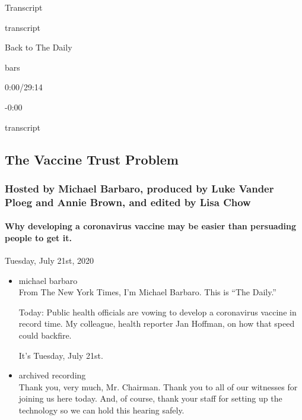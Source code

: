 Transcript

transcript

Back to The Daily

bars

0:00/29:14

-0:00

transcript

\hypertarget{the-vaccine-trust-problem-2}{%
\subsection{The Vaccine Trust
Problem}\label{the-vaccine-trust-problem-2}}

\hypertarget{hosted-by-michael-barbaro-produced-by-luke-vander-ploeg-and-annie-brown-and-edited-by-lisa-chow-1}{%
\subsubsection{Hosted by Michael Barbaro, produced by Luke Vander Ploeg
and Annie Brown, and edited by Lisa
Chow}\label{hosted-by-michael-barbaro-produced-by-luke-vander-ploeg-and-annie-brown-and-edited-by-lisa-chow-1}}

\hypertarget{why-developing-a-coronavirus-vaccine-may-be-easier-than-persuading-people-to-get-it-2}{%
\paragraph{Why developing a coronavirus vaccine may be easier than
persuading people to get
it.}\label{why-developing-a-coronavirus-vaccine-may-be-easier-than-persuading-people-to-get-it-2}}

Tuesday, July 21st, 2020

\begin{itemize}
\item
  michael barbaro\\
  From The New York Times, I'm Michael Barbaro. This is ``The Daily.''

  Today: Public health officials are vowing to develop a coronavirus
  vaccine in record time. My colleague, health reporter Jan Hoffman, on
  how that speed could backfire.

  It's Tuesday, July 21st.
\item
  archived recording\\
  Thank you, very much, Mr. Chairman. Thank you to all of our witnesses
  for joining us here today. And, of course, thank your staff for
  setting up the technology so we can hold this hearing safely.
\end{itemize}

